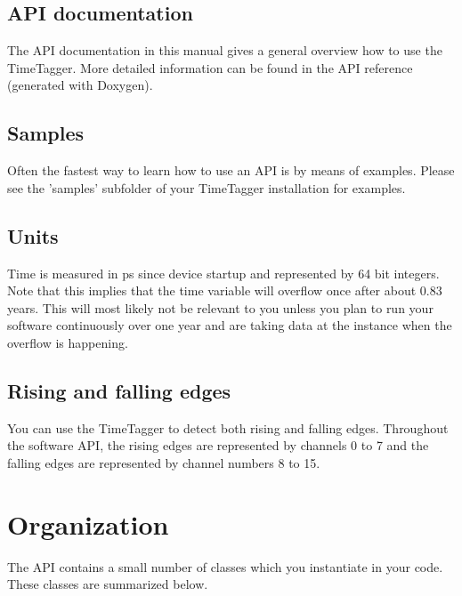 \documentclass[oneside]{memoir}
\begin{document}
\subsection{API documentation}

The API documentation in this manual gives a general overview how to use the TimeTagger.
More detailed information can be found in the API reference (generated with
Doxygen).

\subsection{Samples}

Often the fastest way to learn how to use an API is by means of examples. Please see the 'samples'
subfolder of your TimeTagger installation for examples.

\subsection{Units}

Time is measured in ps since device startup and represented by 64 bit integers. Note that this
implies that the time variable will overflow once after about 0.83 years. This
will most likely not be relevant to you unless you plan to run your software
continuously over one year and are taking data at the instance when the overflow is happening.

\subsection{Rising and falling edges}

You can use the TimeTagger to detect both rising and falling edges. Throughout
the software API, the rising edges are represented by channels 0 to 7 and
the falling edges are represented by channel numbers 8 to 15.

\section{Organization}

The API contains a small number of classes which you instantiate in your code.
These classes are summarized below.
\end{document}
